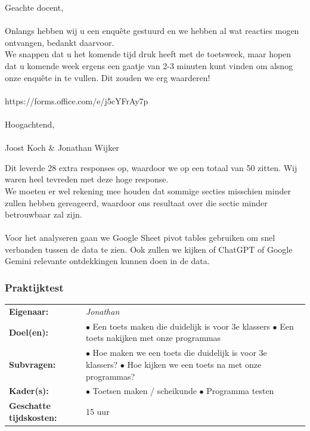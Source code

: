 \documentclass[12pt]{article}
\begin{document}
\begin{multicols}{2}
{\begin{minipage}{\linewidth}
Geachte docent,\\
\\
Onlangs hebben wij u een enquête gestuurd en we hebben al wat reacties mogen ontvangen, bedankt daarvoor.\\
We snappen dat u het komende tijd druk heeft met de toetsweek, maar hopen dat u komende week ergens een gaatje van 2-3 minuten kunt vinden om alsnog onze enquête in te vullen. Dit zouden we erg waarderen!\\
 \\
https://forms.office.com/e/j5cYFrAy7p\\
\\
Hoogachtend,\\
 \\
Joost Koch \& Jonathan Wijker
\end{minipage}}
Dit leverde 28 extra responses op, waardoor we op een totaal van 50 zitten. Wij waren heel tevreden met deze hoge response. \\

We moeten er wel rekening mee houden dat sommige secties misschien minder zullen hebben gereageerd, waardoor ons resultaat over die sectie minder betrouwbaar zal zijn.\\
\\
Voor het analyseren gaan we Google Sheet pivot tables gebruiken om snel verbanden tussen de data te zien. Ook zullen we kijken of ChatGPT of Google Gemini relevante ontdekkingen kunnen doen in de data. 


\end{multicols}
\pagebreak

\subsubsection{Praktijktest}
\begin{tabularx}{0.5\linewidth}{ll}
    \textbf{Eigenaar: } & \textit{Jonathan} \\
    \textbf{Doel(en): } & 
        \makecell[tl]{
            $\bullet$ Een toets maken die duidelijk is voor 3e klassers\\
            $\bullet$ Een toets nakijken met onze programmas\\
        } \\
    \textbf{Subvragen: } & 
        \makecell[tl]{
            $\bullet$ Hoe maken we een toets die duidelijk is voor 3e klassers? \\
            $\bullet$ Hoe kijken we een toets na met onze programmas? \\
        }\\
    \textbf{Kader(s): } & 
        \makecell[tl]{
            $\bullet$ Toetsen maken / scheikunde \\
            $\bullet$ Programma testen \\
        }\\
    \parbox[t]{3cm}{\raggedright\textbf{Geschatte  tijdskosten:} } & 15 uur \\
\end{tabularx}
\end{document}
